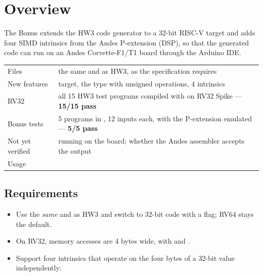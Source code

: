 \documentclass[12pt]{article}
\begin{document}

\section{Overview}

The Bonus extends the HW3 code generator to a 32-bit RISC-V target and adds four SIMD intrinsics from
the Andes P-extension (DSP), so that the generated code can run on an Andes Corvette-F1/T1 board through
the Arduino IDE.

\begin{center}
\begin{tabularx}{0.95\linewidth}{@{}lL@{}}
\toprule
Files & the same  and  as HW3, as the specification requires \\
New features &  target, the  type with unsigned operations, 4 intrinsics \\
RV32 & all 15 HW3 test programs compiled with  on RV32 Spike --- \textbf{15/15 pass} \\
Bonus tests & 5 programs in , 12 inputs each, with the P-extension emulated ---
             \textbf{5/5 pass} \\
Not yet verified & running on the board; whether the Andes assembler accepts the output \\
Usage &  \\
\bottomrule
\end{tabularx}
\end{center}

\subsection{Requirements}

\begin{itemize}
  \item Use the \emph{same}  and  as HW3 and switch to 32-bit code with a
        flag; RV64 stays the default.
  \item On RV32, memory accesses are 4 bytes wide, with  and .
  \item Support four intrinsics that operate on the four bytes of a 32-bit value independently:
\end{itemize}
\end{document}
